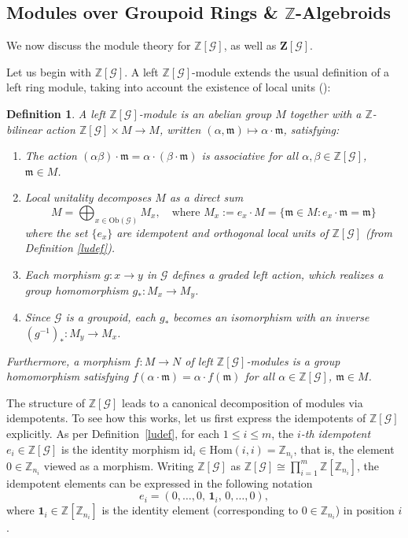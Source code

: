 \documentclass[a4paper,12pt]{article}
\newtheorem{definition}{Definition}[section]
\newcommand{\Z}{\mathbb{Z}}
\newcommand{\Zb}{\mathbf{Z}}
\newcommand{\calG}{\mathcal{G}}
\newcommand{\Ob}{\mathrm{Ob}}
\newcommand{\Hom}{\mathrm{Hom}}
\newcommand{\m}{\mathfrak{m}}
\begin{document}
\subsection{Modules over Groupoid Rings \& $\Z$-Algebroids}


We now discuss the module theory for $\Z[\calG]$, as well as $\Zb[\calG]$.  

Let us begin with $\Z[\calG]$. A left $\Z[\calG]$-module extends the usual definition of a left ring module, taking into account the existence of local units  (\cite{Wisbauer1991, AndersonFuller1992, nastasescu2004methods}): 
\begin{definition}  
\label{def:alg-module}
A \emph{left $\Z[\calG]$-module} is an abelian group $M$ together with
a $\Z$-bilinear action $\Z[\calG] \times M \to M$, written
$(\alpha, \m) \mapsto \alpha \cdot \m$, satisfying:
\begin{enumerate}  
  \item  The action 
        $(\alpha\beta) \cdot \m = \alpha \cdot (\beta \cdot \m)$ is associative 
        for all $\alpha, \beta \in \Z[\calG]$, $\m \in M$.
  \item Local unitality decomposes $M$ as a direct sum
        \[
          M = \bigoplus_{x \in \Ob(\calG)} M_x,
          \quad \text{where } M_x := e_x \cdot M
          = \{\m \in M : e_x \cdot \m = \m\} 
        \]  
        where the set $\{ e_x \}$ are idempotent and orthogonal local units of $\Z[\calG]$ (from Definition \ref{ludef}).  
  \item Each morphism $g : x \to y$ in
        $\calG$ defines a graded left action, which realizes a group
        homomorphism $g_* : M_x \to M_y$.
  \item  Since $\calG$ is a groupoid, each
        $g_*$ becomes an isomorphism with an inverse  
        $(g^{-1})_* : M_y \to M_x$.
\end{enumerate}
Furthermore, a morphism  $f : M \to N$ of left $\Z[\calG]$-modules is a group
homomorphism satisfying $f(\alpha \cdot \m) = \alpha \cdot f(\m)$ for all
$\alpha \in \Z[\calG]$, $\m \in M$.
\end{definition}


The structure of $\Z[\calG]$ leads to a canonical decomposition of modules via idempotents.  To see how this works, let us first express the idempotents of $\Z[\calG]$ explicitly.   
As per Definition~\ref{ludef},  for each $1 \le i \le m$,  the \emph{$i$-th idempotent}   $e_i \in \Z[\calG]$ is the identity morphism
$\mathrm{id}_i \in \Hom(i,i) = \Z_{n_i}$, that is, the element
$0 \in \Z_{n_i}$ viewed as a morphism. Writing $\Z[\calG]$ as  
$\Z[\calG] \cong \prod_{i=1}^{m} \Z[\Z_{n_i}]$, the idempotent elements can be expressed in the following notation 
\[
  e_i = (0, \ldots, 0,\, \mathbf{1}_i,\, 0, \ldots, 0),
\]
where $\mathbf{1}_i \in \Z[\Z_{n_i}]$ is the identity element
(corresponding to $0 \in \Z_{n_i}$) in position $i$.
\end{document}

